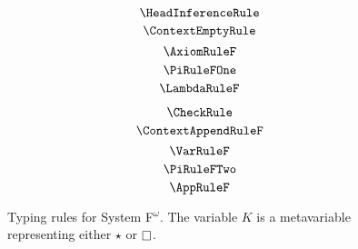 
\begin{figure}
    \centering
    \begin{minipage}{0.5\textwidth}
        $$\HeadInferenceRule$$
        $$\ContextEmptyRule$$
        $$\AxiomRuleF$$
        $$\PiRuleFOne$$
        $$\LambdaRuleF$$
    \end{minipage}%
    \begin{minipage}{0.5\textwidth}
        $$\CheckRule$$
        $$\ContextAppendRuleF$$
        $$\VarRuleF$$
        $$\PiRuleFTwo$$
        $$\AppRuleF$$
    \end{minipage}%
    \caption{
        Typing rules for System F$^\omega$. The variable $K$ is a metavariable representing either $\star$ or $\kind$.
    }
    \label{fig:typing_f}
\end{figure}

